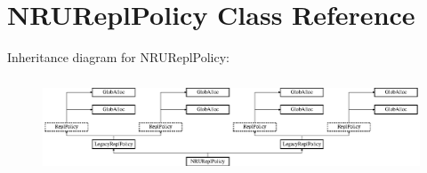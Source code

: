 \hypertarget{classNRUReplPolicy}{\section{N\-R\-U\-Repl\-Policy Class Reference}
\label{classNRUReplPolicy}
}
Inheritance diagram for N\-R\-U\-Repl\-Policy\-:\begin{figure}[H]
\begin{center}
\leavevmode
\includegraphics[height=2.868853cm]{classNRUReplPolicy}
\end{center}
\end{figure}
